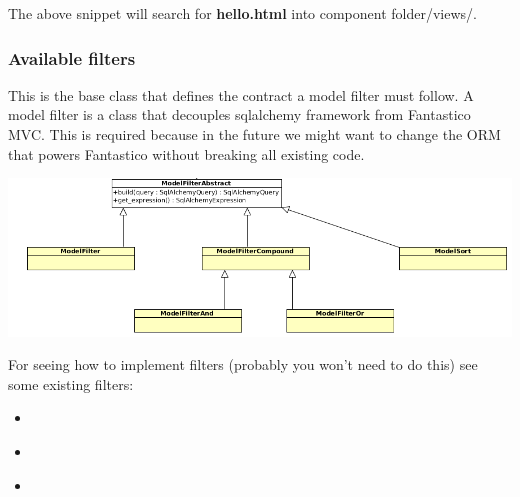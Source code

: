 \documentclass[letterpaper,10pt,english]{sphinxmanual}
\begin{document}
\begin{fulllineitems}
\begin{fulllineitems}
The above snippet will search for \textbf{hello.html} into component folder/views/.

\end{fulllineitems}


\end{fulllineitems}



\subsubsection{Available filters}
\label{features/mvc:available-filters}

\begin{fulllineitems}
\label{features/mvc:fantastico.mvc.models.model_filter.ModelFilterAbstract}
This is the base class that defines the contract a model filter must follow. A model filter is a class that decouples
sqlalchemy framework from Fantastico MVC. This is required because in the future we might want to change the ORM that
powers Fantastico without breaking all existing code.

\includegraphics{mvc_filters.png}

For seeing how to implement filters (probably you won't need to do this) see some existing filters:
\begin{itemize}
\item {} 
{\hyperref[features/mvc:fantastico.mvc.models.model_filter.ModelFilter]{}}

\item {} 
{\hyperref[features/mvc:fantastico.mvc.models.model_filter_compound.ModelFilterCompound]{}}

\item {} 
{\hyperref[features/mvc:fantastico.mvc.models.model_filter_compound.ModelFilterAnd]{}}


\end{itemize}
\end{fulllineitems}
\end{document}
